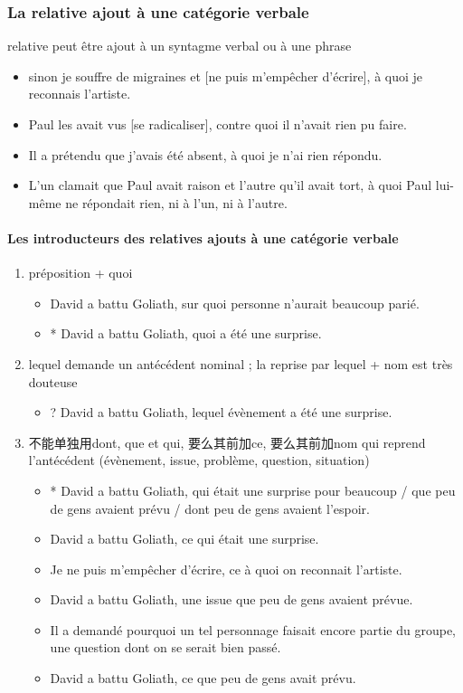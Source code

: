 \documentclass[UTF8]{report}
\begin{document}
\subsubsection{La relative ajout à une catégorie verbale}
relative peut être ajout à un syntagme verbal ou à une phrase
\begin{itemize}
    \item sinon je souffre de migraines et [ne puis m’empêcher d’écrire], à quoi je reconnais l’artiste.
    \item Paul les avait vus [se radicaliser], contre quoi il n’avait rien pu faire.
    \item Il a prétendu que j’avais été absent, à quoi je n’ai rien répondu.
    \item L’un clamait que Paul avait raison et l’autre qu’il avait tort, à quoi Paul lui-même ne répondait rien, ni à l’un, ni à l’autre.
\end{itemize}


\paragraph{Les introducteurs des relatives ajouts à une catégorie verbale}
\begin{enumerate}
    \item préposition + quoi
    \begin{itemize}
        \item David a battu Goliath, sur quoi personne n’aurait beaucoup parié.
        \item * David a battu Goliath, quoi a été une surprise.
    \end{itemize}
    \item lequel demande un antécédent nominal ; la reprise par lequel + nom est très douteuse
    \begin{itemize}
        \item ? David a battu Goliath, lequel évènement a été une surprise.
    \end{itemize}
    \item 不能单独用dont, que et qui, 要么其前加ce, 要么其前加nom qui reprend l’antécédent (évènement, issue, problème, question, situation) 
    \begin{itemize}
        \item * David a battu Goliath, qui était une surprise pour beaucoup / que peu de gens avaient prévu / dont peu de gens avaient l’espoir.
        \item David a battu Goliath, ce qui était une surprise.
        \item Je ne puis m’empêcher d’écrire, ce à quoi on reconnait l’artiste.
        \item David a battu Goliath, une issue que peu de gens avaient prévue.
        \item Il a demandé pourquoi un tel personnage faisait encore partie du groupe, une question dont on se serait bien passé.
        \item David a battu Goliath, ce que peu de gens avait prévu.
    \end{itemize}
\end{enumerate}
\end{document}
